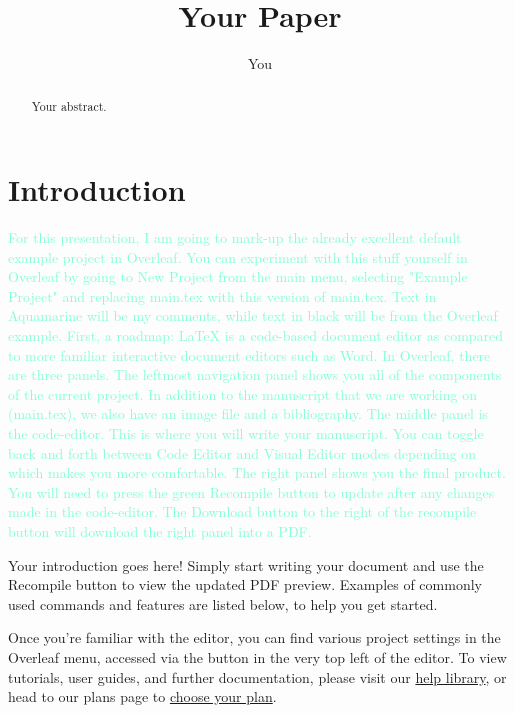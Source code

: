 \documentclass{article}
\title{Your Paper}
\author{You}
\begin{document}
\maketitle

\begin{abstract}
Your abstract.
\end{abstract}

\section{Introduction}


\textcolor{Aquamarine} {For this presentation, I am going to mark-up the already excellent default example project in Overleaf. You can experiment with this stuff yourself in Overleaf by going to New Project from the main menu, selecting "Example Project" and replacing main.tex with this version of main.tex. Text in Aquamarine will be my comments, while text in black will be from the Overleaf example. First, a roadmap: \LaTeX{} is a code-based document editor as compared to more familiar interactive document editors such as Word. In Overleaf, there are three panels. The leftmost navigation panel shows you all of the components of the current project. In addition to the manuscript that we are working on (main.tex), we also have an image file and a bibliography. The middle panel is the code-editor. This is where you will write your manuscript. You can toggle back and forth between Code Editor and Visual Editor modes depending on which makes you more comfortable. The right panel shows you the final product. You will need to press the green Recompile button to update after any changes made in the code-editor. The Download button to the right of the recompile button will download the right panel into a PDF.}



Your introduction goes here! Simply start writing your document and use the Recompile button to view the updated PDF preview. Examples of commonly used commands and features are listed below, to help you get started.

Once you're familiar with the editor, you can find various project settings in the Overleaf menu, accessed via the button in the very top left of the editor. To view tutorials, user guides, and further documentation, please visit our \href{https://www.overleaf.com/learn}{help library}, or head to our plans page to \href{https://www.overleaf.com/user/subscription/plans}{choose your plan}.
\end{document}
